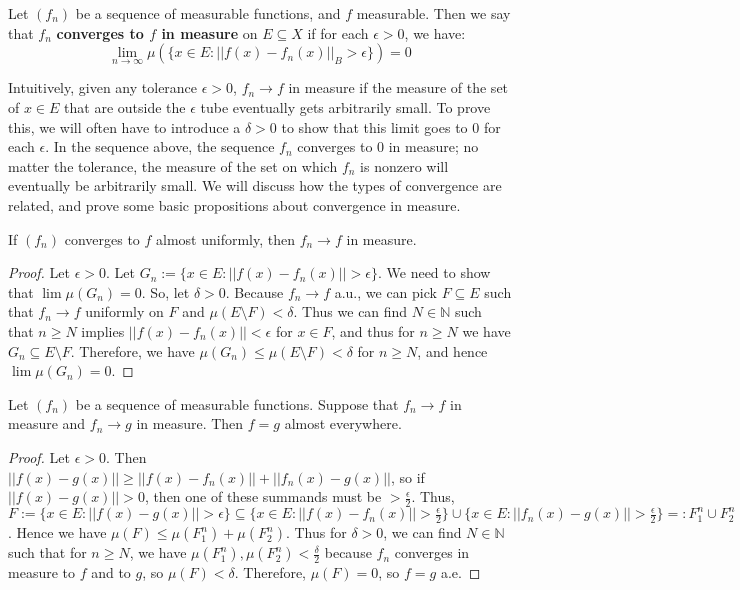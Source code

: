	\begin{definition}
		Let $(f_n)$ be a sequence of measurable functions, and $f$ measurable. Then we say that $f_n$ \textbf{converges 
		to $f$ in measure} on $E\subseteq X$ if for each $\epsilon > 0$, we have:
		$$
			\lim_{n\rightarrow\infty}\mu(\{x\in E : ||f(x) - f_n(x)||_B > \epsilon\}) = 0
		$$
	\end{definition}
	
	Intuitively, given any tolerance $\epsilon > 0$, $f_n\rightarrow f$ in measure if the measure of the set of $x\in E$ that are 
	outside the $\epsilon$ tube eventually gets arbitrarily small. To prove this, we will often have to introduce a $\delta > 0$ 
	to show that this limit goes to 0 for each $\epsilon$. In the sequence above, the sequence $f_n$ converges to 0 in 
	measure; no matter the tolerance, the measure of the set on which $f_n$ is nonzero will eventually be arbitrarily 
	small. We will discuss how the types of convergence are related, and prove some basic propositions about convergence 
	in measure.
	
	\begin{prop}
		If $(f_n)$ converges to $f$ almost uniformly, then $f_n\rightarrow f$ in measure. 
	\end{prop}
	
	\begin{proof}
		Let $\epsilon > 0$. Let $G_n := \{x\in E : ||f(x) - f_n(x)|| > \epsilon\}$. We need to show that $\lim\mu(G_n) = 0$. 
		So, let $\delta > 0$. Because $f_n\rightarrow f$ a.u., we can pick $F\subseteq E$ such that $f_n\rightarrow f$ 
		uniformly on $F$ and $\mu(E\setminus F) < \delta$. Thus we can find $N\in\mathbb N$ such that $n\geq N$ 
		implies $||f(x) - f_n(x)|| < \epsilon$ for $x\in F$, and thus for $n\geq N$ we have $G_n\subseteq E\setminus F$. 
		Therefore, we have $\mu(G_n) \leq\mu(E\setminus F) < \delta$ for $n\geq N$, and hence $\lim\mu(G_n) = 0$.
	\end{proof}
	
	\begin{prop}
		Let $(f_n)$ be a sequence of measurable functions. Suppose that $f_n\rightarrow f$ in measure and $f_n\rightarrow 
		g$ in measure. Then $f = g$ almost everywhere.
	\end{prop}
	
	\begin{proof}
		Let $\epsilon > 0$. Then $||f(x) - g(x)||\geq ||f(x) - f_n(x)|| + ||f_n(x) - g(x)||$, so if $||f(x) - g(x)|| > 0$, then one of 
		these summands must be $> \frac{\epsilon}{2}$. Thus, $F := \{x\in E : ||f(x) - g(x)|| > \epsilon\}\subseteq\{x\in E : 
		||f(x) -  f_n(x)|| > \frac{\epsilon}{2}\}\cup\{x\in E : ||f_n(x) - g(x)|| > \frac{\epsilon}{2}\} =: F_1^n\cup F_2^n$. Hence we 
		have $\mu(F)\leq\mu(F_1^n) + \mu(F_2^n)$. Thus for $\delta > 0$, we can find $N\in\mathbb N$ such that for $n
		\geq N$, we have $\mu(F_1^n), \mu(F_2^n) < \frac{\delta}{2}$ because $f_n$ converges in measure to $f$ and to 
		$g$, so $\mu(F) < \delta$. Therefore, $\mu(F) = 0$, so $f = g$ a.e.
	\end{proof}
	
